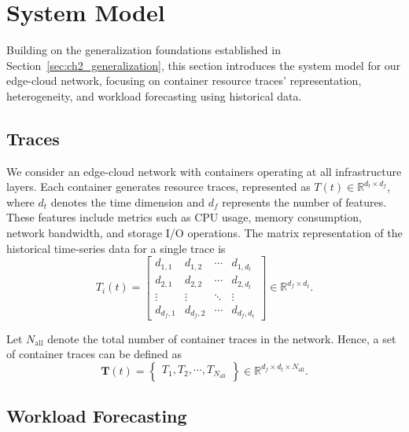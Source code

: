 \section{System Model}
\label{sec:ch4_system_model}

Building on the generalization foundations established in Section~\ref{sec:ch2_generalization}, this section introduces the system model for our edge-cloud network, focusing on container resource traces' representation, heterogeneity, and workload forecasting using historical data.

\subsection{Traces}

We consider an edge-cloud network with containers operating at all infrastructure layers. Each container generates resource traces, represented as $T(t) \in \mathbb{R}^{d_t \times d_f}$, where $d_t$ denotes the time dimension and $d_f$ represents the number of features. These features include metrics such as \ac{CPU} usage, memory consumption, network bandwidth, and storage I/O operations. The matrix representation of the historical time-series data for a single trace is
\begin{equation}
T_i(t) = \begin{bmatrix}
d_{1,1} & d_{1,2} & \cdots & d_{1,d_t} \\
d_{2,1} & d_{2,2} & \cdots & d_{2,d_t} \\
\vdots & \vdots & \ddots & \vdots \\
d_{d_f,1} & d_{d_f,2} & \cdots & d_{d_f,d_t} 
\end{bmatrix} \in \mathbb{R}^{d_f \times d_t}.
\end{equation}

Let \( N_{\text{all}} \) denote the total number of container traces in the network. Hence, a set of container traces can be defined as
\begin{equation}
\mathbf{T}(t) = \begin{Bmatrix} T_1, T_2, \cdots, T_{N_\text{all}} \end{Bmatrix} \in \mathbb{R}^{d_f \times d_t \times N_{\text{all}}}.
\end{equation}

\subsection{Workload Forecasting}

